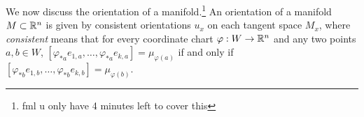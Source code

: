 \noindent We now discuss the orientation of a manifold.\footnote{fml u only have 4 minutes left to cover this} An orientation of a manifold $M \subset \mathbb R^n$ is given by consistent orientations $u_x$ on each tangent space $M_x$, where \textit{consistent} means that for every coordinate chart $\varphi : W \to \mathbb R^n$ and any two points $a, b \in W$, $[\varphi_{\ast a} e_{1,a}, \dots, \varphi_{\ast a} e_{k, a}] = \mu_{\varphi(a)}$ if and only if $[\varphi_{\ast b} e_{1, b}, \dots, \varphi_{\ast b} e_{k, b}] = \mu_{\varphi(b)}$.